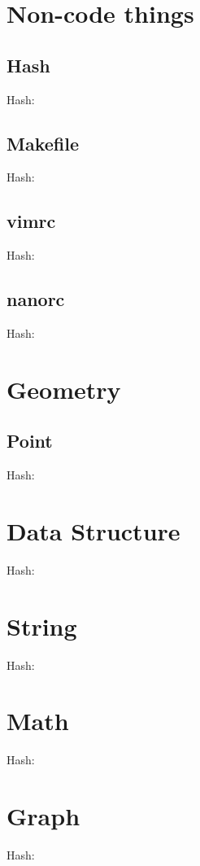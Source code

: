 \documentclass[10pt]{article}
\newcommand{\inputfile}[2]{
    Hash: \texttt{}
    
}
\begin{document}
\begin{multicols*}{3}
    \tableofcontents


    \section{Non-code things}
    \subsection{Hash}
    \inputfile{hash.sh}{txt}
    \subsection{Makefile}
    \inputfile{Makefile}{txt}
    \subsection{vimrc}
    \inputfile{vimrc}{txt}
    \subsection{nanorc}
    \inputfile{nanorc}{txt}

    \section{Geometry}
    \subsection{Point}
    \inputfile{kactl-geometry-point.h}{cpp}
	
	\section{Data Structure}
	\inputfile{data_structure_LCT.cpp}{cpp}
	
	\section{String}
	\inputfile{string_SAM.cpp}{cpp}
	
	\section{Math}
	\inputfile{math_simplex.cpp}{cpp}
	
	\section{Graph}
	\inputfile{graph_clique.cpp}{cpp}
	

\end{multicols*}
\end{document}
